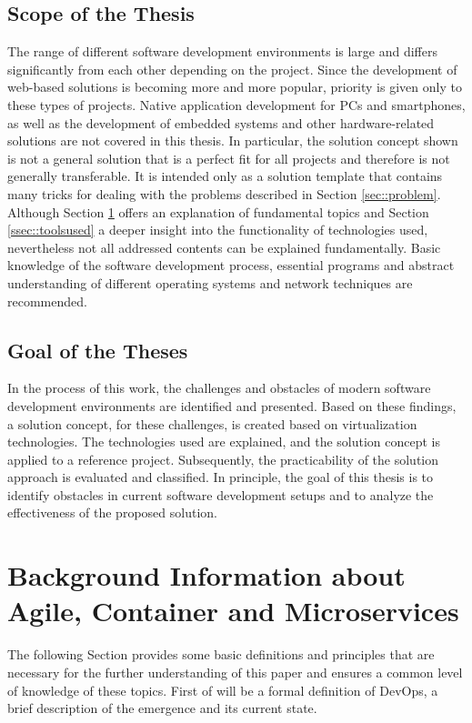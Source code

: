 \documentclass[12pt, a4paper]{article}
\begin{document}
    \subsection{Scope of the Thesis}
    The range of different software development environments is large and differs significantly from each other depending on the project. Since the development of web-based solutions is becoming more and more popular, priority is given only to these types of projects. Native application development for PCs and smartphones, as well as the development of embedded systems and other hardware-related solutions are not covered in this thesis.\newline
    In particular, the solution concept shown is not a general solution that is a perfect fit for all projects and therefore is not generally transferable. It is intended only as a solution template that contains many tricks for dealing with the problems described in Section \ref{sec::problem}. Although Section \ref{sec::backgrund} offers an explanation of fundamental topics and Section \ref{ssec::toolsused} a deeper insight into the functionality of technologies used, nevertheless not all addressed contents can be explained fundamentally. Basic knowledge of the software development process, essential programs and abstract understanding of different operating systems and network techniques are recommended.

    \subsection{Goal of the Theses}
    In the process of this work, the challenges and obstacles of modern software development environments are identified and presented. Based on these findings, a solution concept, for these challenges, is created based on virtualization technologies. The technologies used are explained, and the solution concept is applied to a reference project. Subsequently, the practicability of the solution approach is evaluated and classified. In principle, the goal of this thesis is to identify obstacles in current software development setups and to analyze the effectiveness of the proposed solution.

\section{Background Information about Agile, Container and Microservices}\label{sec::backgrund}
The following Section provides some basic definitions and principles that are necessary for the further understanding of this paper and ensures a common level of knowledge of these topics.\newline
First of will be a formal definition of DevOps, a brief description of the emergence and its current state.
\end{document}

